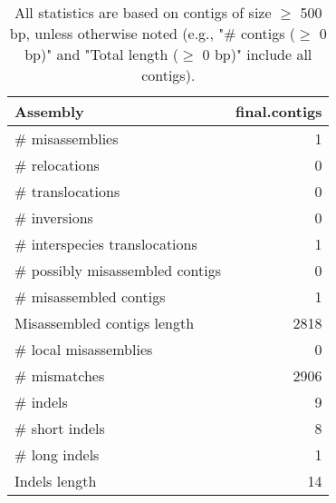 \documentclass[12pt,a4paper]{article}
\begin{document}
\begin{table}[ht]
\begin{center}
\caption{All statistics are based on contigs of size $\geq$ 500 bp, unless otherwise noted (e.g., "\# contigs ($\geq$ 0 bp)" and "Total length ($\geq$ 0 bp)" include all contigs).}
\begin{tabular}{|l*{1}{|r}|}
\hline
Assembly & final.contigs \\ \hline
\# misassemblies & 1 \\ \hline
\hspace{5mm}\# relocations & 0 \\ \hline
\hspace{5mm}\# translocations & 0 \\ \hline
\hspace{5mm}\# inversions & 0 \\ \hline
\hspace{5mm}\# interspecies translocations & 1 \\ \hline
\# possibly misassembled contigs & 0 \\ \hline
\# misassembled contigs & 1 \\ \hline
Misassembled contigs length & 2818 \\ \hline
\# local misassemblies & 0 \\ \hline
\# mismatches & 2906 \\ \hline
\# indels & 9 \\ \hline
\hspace{5mm}\# short indels & 8 \\ \hline
\hspace{5mm}\# long indels & 1 \\ \hline
Indels length & 14 \\ \hline
\end{tabular}
\end{center}
\end{table}
\end{document}
